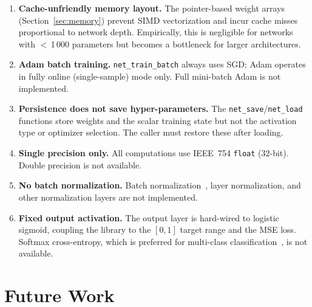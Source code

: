 \documentclass[11pt,a4paper]{article}
\begin{document}
\begin{enumerate}[leftmargin=2.4em]
  \item \textbf{Cache-unfriendly memory layout.} The pointer-based weight
    arrays (Section~\ref{sec:memory}) prevent SIMD vectorization and incur
    cache misses proportional to network depth. Empirically, this is
    negligible for networks with $<$\,1\,000 parameters but becomes a
    bottleneck for larger architectures.

  \item \textbf{Adam batch training.} \texttt{net\_train\_batch} always
    uses SGD; Adam operates in fully online (single-sample) mode only.
    Full mini-batch Adam is not implemented.

  \item \textbf{Persistence does not save hyper-parameters.} The
    \texttt{net\_save}/\texttt{net\_load} functions store weights and the
    scalar training state but not the activation type or optimizer selection.
    The caller must restore these after loading.

  \item \textbf{Single precision only.} All computations use IEEE~754
    \texttt{float} (32-bit). Double precision is not available.

  \item \textbf{No batch normalization.} Batch normalization~\cite{ioffe2015},
    layer normalization, and other normalization layers are not implemented.

  \item \textbf{Fixed output activation.} The output layer is hard-wired to
    logistic sigmoid, coupling the library to the $[0,1]$ target range and
    the MSE loss. Softmax cross-entropy, which is preferred for
    multi-class classification~\cite{goodfellow2016}, is not available.
\end{enumerate}

\section{Future Work}
\label{sec:future}
\end{document}
